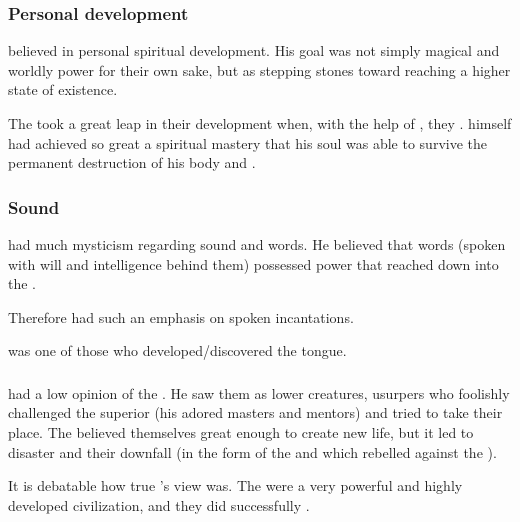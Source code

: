 \subsubsection{Personal development}
\Sethicus believed in personal spiritual development. 
His goal was not simply magical and worldly power for their own sake, but as stepping stones toward reaching a higher state of existence. 

The \dragons took a great leap in their development when, with the help of \KhothSell, they . 
\Sethicus himself had achieved so great a spiritual mastery that his soul was able to survive the permanent destruction of his body and \Sethicus {}. 






\subsubsection{Sound}
\Sethicus had much mysticism regarding sound and words. 
He believed that words (spoken with will and intelligence behind them) possessed power that reached down into the . 

Therefore  had such an emphasis on spoken incantations.

\Sethicus was one of those who developed/discovered the  tongue. 






\subsubsection{\Voyagers}
\Sethicus had a low opinion of the \voyagers.
He saw them as lower creatures, usurpers who foolishly challenged the superior \xss (his adored masters and mentors) and tried to take their place.
The \voyagers believed themselves great enough to create new life, but it led to disaster and their downfall (in the form of the  and  which rebelled against the \voyagers). 

It is debatable how true \Sethicus's view was.
The \voyagers were a very powerful and highly developed civilization, and they did successfully . 























